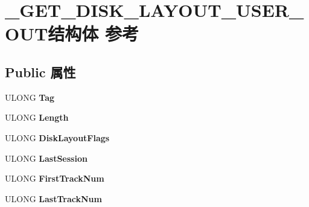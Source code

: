 \hypertarget{struct___g_e_t___d_i_s_k___l_a_y_o_u_t___u_s_e_r___o_u_t}{}\section{\+\_\+\+G\+E\+T\+\_\+\+D\+I\+S\+K\+\_\+\+L\+A\+Y\+O\+U\+T\+\_\+\+U\+S\+E\+R\+\_\+\+O\+U\+T结构体 参考}
\label{struct___g_e_t___d_i_s_k___l_a_y_o_u_t___u_s_e_r___o_u_t}
\subsection*{Public 属性}
\begin{DoxyCompactItemize}
\item 
\mbox{\label{struct___g_e_t___d_i_s_k___l_a_y_o_u_t___u_s_e_r___o_u_t_a2fbfbc24e8dd06a48081946fb6de0e14}} 
U\+L\+O\+NG {\bfseries Tag}
\item 
\mbox{\label{struct___g_e_t___d_i_s_k___l_a_y_o_u_t___u_s_e_r___o_u_t_a40b7dba23e88c7cac4c6e43eade07a60}} 
U\+L\+O\+NG {\bfseries Length}
\item 
\mbox{\label{struct___g_e_t___d_i_s_k___l_a_y_o_u_t___u_s_e_r___o_u_t_a3a0e36ca73057f49567068dd06b4065a}} 
U\+L\+O\+NG {\bfseries Disk\+Layout\+Flags}
\item 
\mbox{\label{struct___g_e_t___d_i_s_k___l_a_y_o_u_t___u_s_e_r___o_u_t_aa6ce259b890cedff5cfe76d2a3a4f7d2}} 
U\+L\+O\+NG {\bfseries Last\+Session}
\item 
\mbox{\label{struct___g_e_t___d_i_s_k___l_a_y_o_u_t___u_s_e_r___o_u_t_a5c866a93511208065bb3273fed775305}} 
U\+L\+O\+NG {\bfseries First\+Track\+Num}
\item 
\mbox{\label{struct___g_e_t___d_i_s_k___l_a_y_o_u_t___u_s_e_r___o_u_t_ac40e71cbd9326afcd17f5a6915e773ac}} 
U\+L\+O\+NG {\bfseries Last\+Track\+Num}

\end{DoxyCompactItemize}
